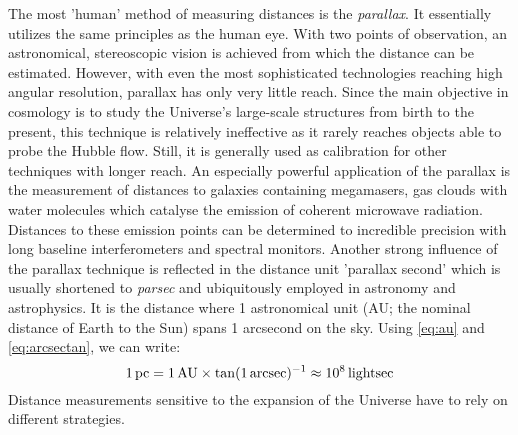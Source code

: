 The most 'human' method of measuring distances is the \textit{parallax}.  It
essentially utilizes the same principles as the human eye.  With two points of
observation, an astronomical, stereoscopic vision is achieved from which the
distance can be estimated.  However, with even the most sophisticated
technologies reaching high angular resolution, parallax has only very little
reach.  Since the main objective in cosmology is to study the Universe's
large-scale structures from birth to the present, this technique is relatively
ineffective as it rarely reaches objects able to probe the Hubble flow.  Still,
it is generally used as calibration for other techniques with longer reach.  An
especially powerful application of the parallax is the measurement of distances
to galaxies containing megamasers, gas clouds with water molecules which
catalyse the emission of coherent microwave radiation.  Distances to these
emission points can be determined to incredible precision with long baseline
interferometers and spectral monitors.  Another strong influence of the parallax
technique is reflected in the distance unit 'parallax second' which is usually
shortened to \textit{parsec} and ubiquitously employed in astronomy and
astrophysics.  It is the distance where 1 astronomical unit (AU; the nominal
distance of Earth to the Sun) spans 1 arcsecond on the sky.  Using \ref{eq:au}
and \ref{eq:arcsectan}, we can write:
%
\begin{equation}%
    1\,\parsec = 1\,\AU \times \tan(1\,\arcsec)^{-1} \approx 10^{8}\,\lightsec
    \eqlbl{parsec}
\end{equation}%
%
Distance measurements sensitive to the expansion of the Universe have to rely on
different strategies.


